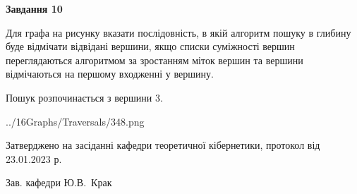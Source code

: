\documentclass[12pt, ukrainian]{article}
\begin{document}
{\begin {large}
{\begin {center}\textbf{Завдання 10}\end {center}}\par
Для графа на рисунку вказати послідовність, в якій алгоритм пошуку в глибину буде відмічати відвідані вершини, якщо списки суміжності вершин переглядаються алгоритмом за зростанням міток вершин та вершини відмічаються на першому вход\-женні у вершину.\par
Пошук розпочинається з вершини 3.\par

\begin{center}
	{../16Graphs/Traversals/348.png}
\end{center}\par
\newpage


\end {large}
}
{\smallskip \begin {small} Затверджено на засіданні кафедри теоретичної кібернетики, протокол  від   23.01.2023 р.\par\smallskip\smallskip
{\parbox {6.5 cm}{Зав. кафедри \dotfill Ю.В.~Крак}} \end{small}}
\end{document}
